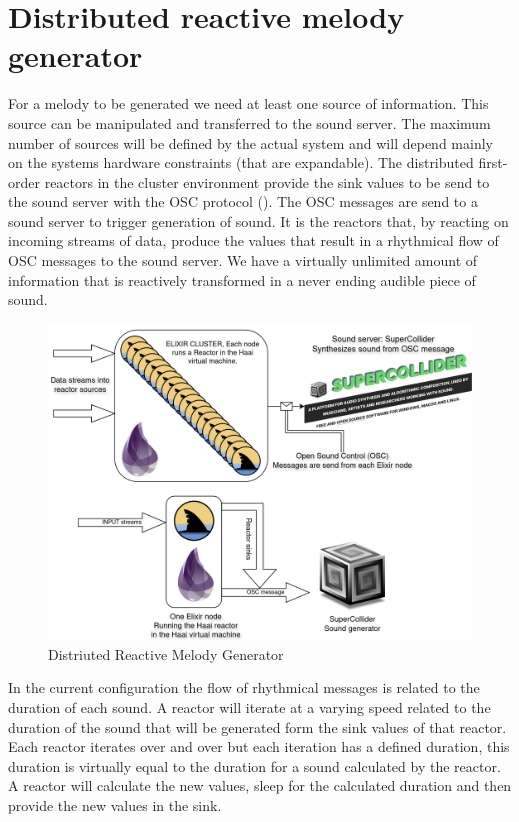 \documentclass[a4paper]{book}
\begin{document}
\section{Distributed reactive melody generator} \label{sec:drmg}
For a melody to be generated we need at least one source of information. This source can be manipulated and transferred to the sound server. The maximum number of sources will be defined by the actual system and will depend mainly on the systems hardware constraints (that are expandable). The distributed first-order reactors in the cluster environment provide the sink values to be send to the sound server with the OSC protocol (\cite{schmeder2010best}). The OSC messages are send to a sound server to trigger generation of sound. It is the reactors that, by reacting on incoming streams of data, produce the values that result in a rhythmical flow of OSC messages to the sound server. We have a virtually unlimited amount of information that is reactively transformed in a never ending audible piece of sound.

\begin{figure}[h]
	\includegraphics[width=\textwidth]{drmg200.drawio}
	\caption{Distriuted Reactive Melody Generator}
	\label{fig:drmg}
\end{figure}
 
In the current configuration the flow of rhythmical messages is related to the duration of each sound. A reactor will iterate at a varying speed related to the duration of the sound that will be generated form the sink values of that reactor. Each reactor iterates over and over but each iteration has a defined duration, this duration is virtually equal to the duration for a sound calculated by the reactor. A reactor will calculate the new values, sleep for the calculated duration and then provide the new values in the sink. 
\end{document}
